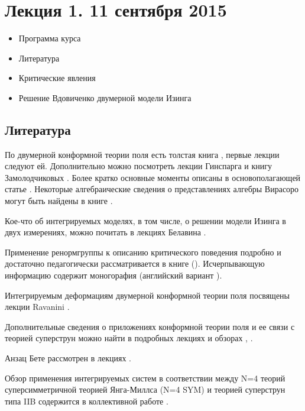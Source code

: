 \documentclass[a4paper,12pt]{article} \usepackage[utf8x]{inputenc} \usepackage[russian]{babel}
\theoremstyle{definition} \newtheorem{corollary}{Corollary}[theorem] \theoremstyle{definition}
\begin{document}
\section{Лекция 1. 11 сентября 2015}
\label{sec:-1}

  \begin{itemize}
  \item Программа курса
  \item Литература
  \item Критические явления
  \item Решение Вдовиченко двумерной модели Изинга
  \end{itemize}

\subsection{Литература}
\label{sec:literature}

По двумерной конформной теории поля есть толстая книга \cite{difrancesco1997cft}, первые лекции
следуют ей. Дополнительно можно посмотреть лекции Гинспарга \cite{Ginsparg:1988ui} и книгу
Замолодчиковых \cite{zamolodchikov1989rus,zamolodchikov1989conformal}. Более кратко основные моменты
описаны в основополагающей статье \cite{belavin1984ics}. Некоторые алгебраические сведения о
представлениях алгебры Вирасоро могут быть найдены в книге \cite{golod2001}.

Кое-что об интегрируемых моделях, в том числе, о решении модели Изинга в двух измерениях, можно
почитать в лекциях Белавина \cite{belavin2001lect}.

Применение ренормгруппы к описанию критического поведения подробно и достаточно педагогически
рассматривается в книге \cite{ma1980} (\cite{ma2000modern}). Исчерпывающую информацию содержит
моногорафия \cite{vasiliev1998} (английский вариант \cite{Vasilev:1027193}).

Интегрируемым деформациям двумерной конформной теории поля посвящены лекции Ravanini
\cite{Ravanini:2000st}.

Дополнительные сведения о приложениях конформной теории поля и ее связи с теорией суперструн можно
найти в подробных лекциях \cite{springerlink:10.1134/S1063778810050108} и обзорах
\cite{Walton:1999xc}, \cite{gaberdiel2000icf}.

Анзац Бете рассмотрен в лекциях \cite{faddeev1996algebraic}.

Обзор применения интегрируемых систем в соответствии между N=4 теорий суперсимметричной теорией
Янга-Миллса (N=4 SYM) и теорией суперструн типа IIB содержится в коллективной работе
\cite{ReviewAdSCFT}.
\end{document}
